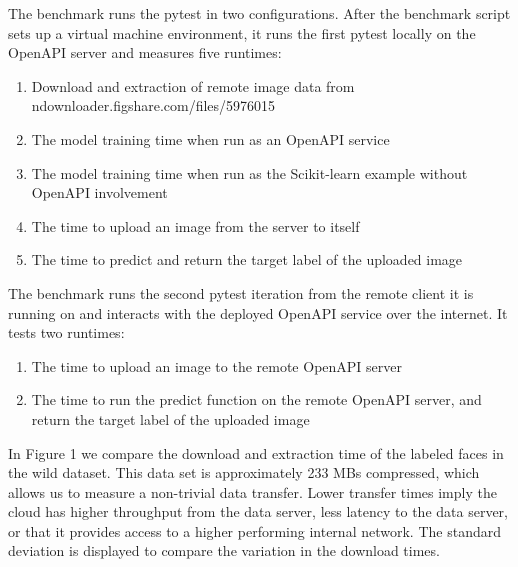 The benchmark runs the pytest in two configurations. After the benchmark
script sets up a virtual machine environment, it runs the first pytest
locally on the OpenAPI server and measures five runtimes:

\begin{enumerate}
\def\labelenumi{\arabic{enumi}.}
\tightlist
\item
  Download and extraction of remote image data from
  ndownloader.figshare.com/files/5976015
\item
  The model training time when run as an OpenAPI service
\item
  The model training time when run as the Scikit-learn example without
  OpenAPI involvement
\item
  The time to upload an image from the server to itself
\item
  The time to predict and return the target label of the uploaded image
\end{enumerate}

The benchmark runs the second pytest iteration from the remote client it
is running on and interacts with the deployed OpenAPI service over the
internet. It tests two runtimes:

\begin{enumerate}
\def\labelenumi{\arabic{enumi}.}
\tightlist
\item
  The time to upload an image to the remote OpenAPI server
\item
  The time to run the predict function on the remote OpenAPI server, and
  return the target label of the uploaded image
\end{enumerate}

In Figure 1 we compare the download and extraction time of the labeled
faces in the wild dataset. This data set is approximately 233 MBs
compressed, which allows us to measure a non-trivial data transfer.
Lower transfer times imply the cloud has higher throughput from the data
server, less latency to the data server, or that it provides access to a
higher performing internal network. The standard deviation is displayed
to compare the variation in the download times.

